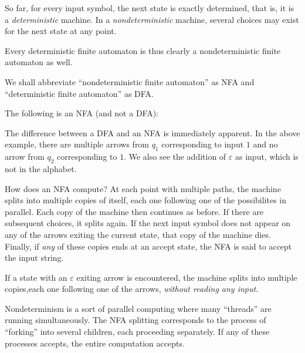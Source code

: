 So far, for every input symbol, the next state is exactly determined, that is, it is a \textit{deterministic} machine. In a \textit{nondeterministic} machine, several choices may exist for the next state at any point.

Every deterministic finite automaton is thus clearly a nondeterministic finite automaton as well.

We shall abbreviate ``nondeterministic finite automaton'' as NFA and ``deterministic finite automaton'' as DFA.

\begin{example}
The following is an NFA (and not a DFA):
\begin{center}
\end{center}
\end{example}

The difference between a DFA and an NFA is immediately apparent. In the above example, there are multiple arrows from $q_1$ corresponding to input $1$ and no arrow from $q_2$ corresponding to $1$. We also see the addition of $\varepsilon$ as input, which is not in the alphabet.

\vspace{2mm}
How does an NFA compute? At each point with multiple paths, the machine splits into multiple copies of itself, each one following one of the possibilites in parallel. Each copy of the machine then continues as before. If there are subsequent choices, it splits again. If the next input symbol does not appear on any of the arrows exiting the current state, that copy of the machine dies. Finally, if \textit{any} of these copies ends at an accept state, the NFA is said to accept the input string.

If a state with an $\varepsilon$ exiting arrow is encountered, the machine splits into multiple copies,each one following one of the arrows, \textit{without reading any input}.

\vspace{3mm}
Nondeterminism is a sort of parallel computing where many ``threads'' are running simultaneously. The NFA splitting corresponds to the process of ``forking'' into several children, each proceeding separately. If any of these processes accepts, the entire computation accepts.


